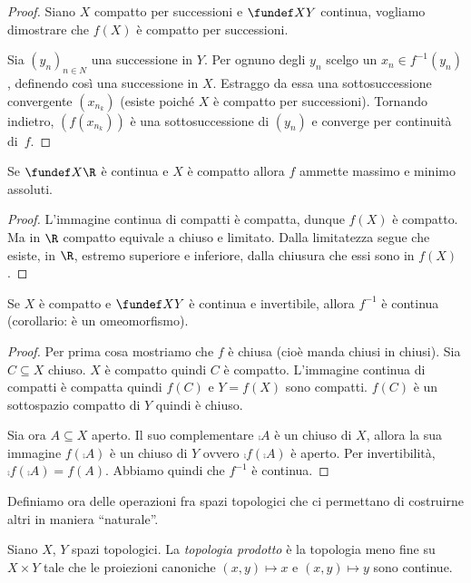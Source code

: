 \begin{proof}
	Siano $X$ compatto per successioni e $\fundef XY$ continua,
	vogliamo dimostrare che $f(X)$ è compatto per successioni.
	
	Sia $(y_n)_{n\in N}$ una successione in $Y$.
	Per ognuno degli $y_n$ scelgo un $x_n\in f^{-1}(y_n)$,
	definendo così una successione in $X$.
	Estraggo da essa una sottosuccessione convergente $(x_{n_k})$
	(esiste poiché $X$ è compatto per successioni).
	Tornando indietro, $(f(x_{n_k}))$ è una sottosuccessione di $(y_n)$
	e converge per continuità di~$f$.
\end{proof}

\begin{lemma}
	Se $\fundef X\R$ è continua e $X$ è compatto allora $f$ ammette massimo e minimo assoluti.
\end{lemma}

\begin{proof}
	L'immagine continua di compatti è compatta,
	dunque $f(X)$ è compatto.
	Ma in $\R$ compatto equivale a chiuso e limitato.
	Dalla limitatezza segue che esiste, in $\R$, estremo superiore e inferiore,
	dalla chiusura che essi sono in $f(X)$.
\end{proof}

\begin{lemma}
	Se $X$ è compatto e $\fundef XY$ è continua e invertibile,
	allora $f^{-1}$ è continua
	(corollario: è un omeomorfismo).
\end{lemma}

\begin{proof}
	Per prima cosa mostriamo che $f$ è chiusa (cioè manda chiusi in chiusi).
	Sia $C\subseteq X$ chiuso.
	$X$ è compatto quindi $C$ è compatto.
	L'immagine continua di compatti è compatta quindi $f(C)$ e $Y=f(X)$ sono compatti.
	$f(C)$ è un sottospazio compatto di $Y$ quindi è chiuso.
	
	Sia ora $A\subseteq X$ aperto.
	Il suo complementare $\comp A$ è un chiuso di $X$,
	allora la sua immagine $f(\comp A)$ è un chiuso di $Y$ ovvero $\comp{f(\comp A)}$ è aperto.
	Per invertibilità, $\comp{f(\comp A)}=f(A)$.
	Abbiamo quindi che $f^{-1}$ è continua.
\end{proof}


Definiamo ora delle operazioni fra spazi topologici
che ci permettano di costruirne altri in maniera ``naturale''.

\begin{defn}
	Siano $X$, $Y$ spazi topologici.
	La \emph{topologia prodotto} è la topologia meno fine su $X\times Y$
	tale che le proiezioni canoniche $(x,y)\mapsto x$ e $(x, y)\mapsto y$	sono continue.
\end{defn}

